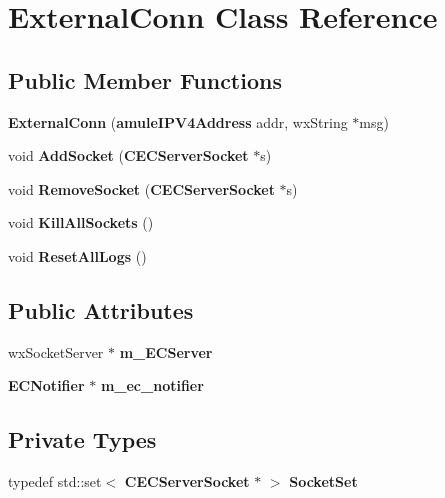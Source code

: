 \section{ExternalConn Class Reference}
\label{classExternalConn}
\subsection*{Public Member Functions}
\begin{DoxyCompactItemize}
\item 
{\bfseries ExternalConn} ({\bf amuleIPV4Address} addr, wxString $\ast$msg)\label{classExternalConn_a82b246b3b48c853236747b53ea63899e}

\item 
void {\bfseries AddSocket} ({\bf CECServerSocket} $\ast$s)\label{classExternalConn_aa7e902e89229c9e4e44c30509758b5a8}

\item 
void {\bfseries RemoveSocket} ({\bf CECServerSocket} $\ast$s)\label{classExternalConn_a421037c69cf98fe849ddb0e60e3d951d}

\item 
void {\bfseries KillAllSockets} ()\label{classExternalConn_a81cc841337eb562f906244151cf12c16}

\item 
void {\bfseries ResetAllLogs} ()\label{classExternalConn_a775e4f286d82b554c775b92c6ff0718b}

\end{DoxyCompactItemize}
\subsection*{Public Attributes}
\begin{DoxyCompactItemize}
\item 
wxSocketServer $\ast$ {\bfseries m\_\-ECServer}\label{classExternalConn_a65c7a864ee74b09a7f2590c3e400682a}

\item 
{\bf ECNotifier} $\ast$ {\bfseries m\_\-ec\_\-notifier}\label{classExternalConn_a0b7ebe8e5735f2412d1dd19b0e274fa8}

\end{DoxyCompactItemize}
\subsection*{Private Types}
\begin{DoxyCompactItemize}
\item 
typedef std::set$<$ {\bf CECServerSocket} $\ast$ $>$ {\bfseries SocketSet}\label{classExternalConn_a148605a865540e391c73d59b93866f77}

\end{DoxyCompactItemize}
